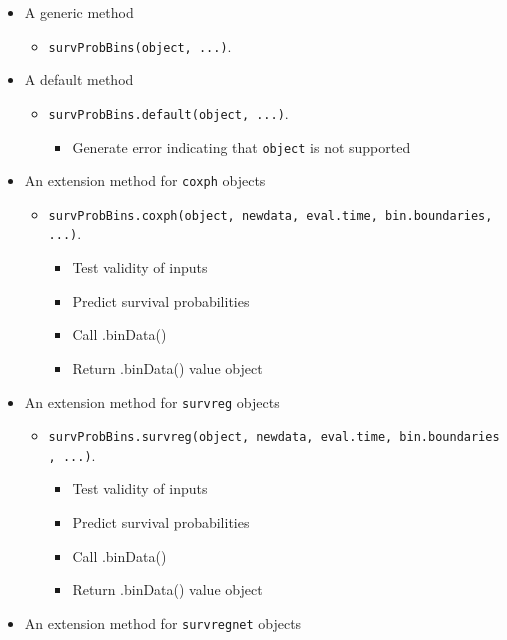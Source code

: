 \documentclass[
]{book}
\providecommand{\tightlist}{%
  \setlength{\itemsep}{0pt}\setlength{\parskip}{0pt}}
\begin{document}
\begin{itemize}
\tightlist
\item
  A generic method

  \begin{itemize}
  \tightlist
  \item
    \texttt{survProbBins(object,\ ...)}.
  \end{itemize}
\item
  A default method

  \begin{itemize}
  \tightlist
  \item
    \texttt{survProbBins.default(object,\ ...)}.

    \begin{itemize}
    \tightlist
    \item
      Generate error indicating that \texttt{object} is not supported
    \end{itemize}
  \end{itemize}
\item
  An extension method for \texttt{coxph} objects

  \begin{itemize}
  \tightlist
  \item
    \texttt{survProbBins.coxph(object,\ newdata,\ eval.time,\ bin.boundaries,\ ...)}.

    \begin{itemize}
    \tightlist
    \item
      Test validity of inputs
    \item
      Predict survival probabilities
    \item
      Call .binData()
    \item
      Return .binData() value object
    \end{itemize}
  \end{itemize}
\item
  An extension method for \texttt{survreg} objects

  \begin{itemize}
  \tightlist
  \item
    \texttt{survProbBins.survreg(object,\ newdata,\ eval.time,\ bin.boundaries,\ ...)}.

    \begin{itemize}
    \tightlist
    \item
      Test validity of inputs
    \item
      Predict survival probabilities
    \item
      Call .binData()
    \item
      Return .binData() value object
    \end{itemize}
  \end{itemize}
\item
  An extension method for \texttt{survregnet} objects


\end{itemize}
\end{document}
